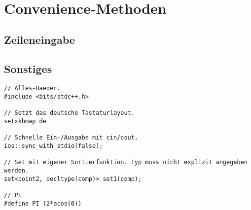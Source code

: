 \section{Convenience-Methoden}

\subsection{Zeileneingabe}


\subsection{Sonstiges}
\begin{lstlisting}
// Alles-Haeder.
#include <bits/stdc++.h>

// Setzt das deutsche Tastaturlayout.
setxkbmap de

// Schnelle Ein-/Ausgabe mit cin/cout.
ios::sync_with_stdio(false);

// Set mit eigener Sortierfunktion. Typ muss nicht explizit angegeben werden.
set<point2, decltype(comp)> set1(comp);

// PI
#define PI (2*acos(0))
\end{lstlisting}
